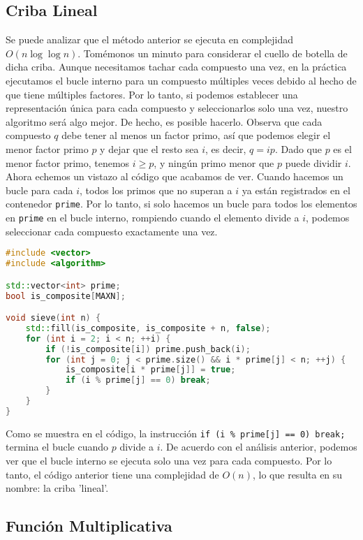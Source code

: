 \documentclass[11pt]{scrartcl}
\begin{document}
\subsection*{Criba Lineal}

Se puede analizar que el método anterior se ejecuta en complejidad \(O(n \log \log n)\). Tomémonos un minuto para considerar el cuello de botella de dicha criba. Aunque necesitamos tachar cada compuesto una vez, en la práctica ejecutamos el bucle interno para un compuesto múltiples veces debido al hecho de que tiene múltiples factores. Por lo tanto, si podemos establecer una representación única para cada compuesto y seleccionarlos solo una vez, nuestro algoritmo será algo mejor. De hecho, es posible hacerlo. Observa que cada compuesto \(q\) debe tener al menos un factor primo, así que podemos elegir el menor factor primo \(p\) y dejar que el resto sea \(i\), es decir, \(q = ip\). Dado que \(p\) es el menor factor primo, tenemos \(i \geq p\), y ningún primo menor que \(p\) puede dividir \(i\). Ahora echemos un vistazo al código que acabamos de ver. Cuando hacemos un bucle para cada \(i\), todos los primos que no superan a \(i\) ya están registrados en el contenedor \texttt{prime}. Por lo tanto, si solo hacemos un bucle para todos los elementos en \texttt{prime} en el bucle interno, rompiendo cuando el elemento divide a \(i\), podemos seleccionar cada compuesto exactamente una vez.

\begin{lstlisting}[language=C++,caption=Criba Lineal]
#include <vector>
#include <algorithm>

std::vector<int> prime;
bool is_composite[MAXN];

void sieve(int n) {
    std::fill(is_composite, is_composite + n, false);
    for (int i = 2; i < n; ++i) {
        if (!is_composite[i]) prime.push_back(i);
        for (int j = 0; j < prime.size() && i * prime[j] < n; ++j) {
            is_composite[i * prime[j]] = true;
            if (i % prime[j] == 0) break;
        }
    }
}
\end{lstlisting}

Como se muestra en el código, la instrucción \texttt{if (i \% prime[j] == 0) break;} termina el bucle cuando \(p\) divide a \(i\). De acuerdo con el análisis anterior, podemos ver que el bucle interno se ejecuta solo una vez para cada compuesto. Por lo tanto, el código anterior tiene una complejidad de \(O(n)\), lo que resulta en su nombre: la criba 'lineal'.

\subsection*{Función Multiplicativa}
\end{document}
